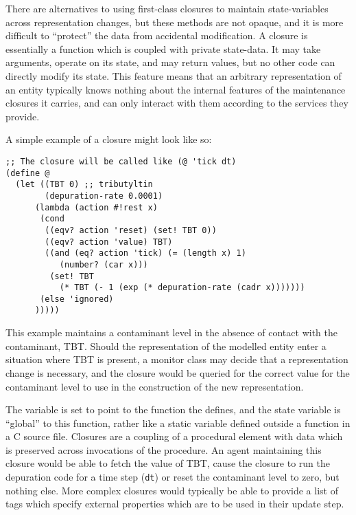 There are alternatives to using first-class closures to maintain
state-variables across representation changes, but these methods are
not opaque, and it is more difficult to ``protect'' the data from
accidental modification.  A closure is essentially a function which is
coupled with private state-data. It may take arguments, operate on its
state, and may return values, but no other code can directly modify
its state.  This feature means that an arbitrary representation of an
entity typically knows nothing about the internal features of the
maintenance closures it carries, and can only interact with them
according to the services they provide.

A simple example of a closure might look like so:
\begin{verbatim}
;; The closure will be called like (@ 'tick dt) 
(define @
  (let ((TBT 0) ;; tributyltin
        (depuration-rate 0.0001) 
      (lambda (action #!rest x)
       (cond
        ((eqv? action 'reset) (set! TBT 0))
        ((eqv? action 'value) TBT)
        ((and (eq? action 'tick) (= (length x) 1) 
           (number? (car x)))
         (set! TBT 
           (* TBT (- 1 (exp (* depuration-rate (cadr x)))))))
       (else 'ignored)
      )))))

\end{verbatim}
This example maintains a contaminant level in the absence of contact
with the contaminant, TBT.  Should the representation of the
modelled entity enter a situation where TBT is present, a monitor
class may decide that a representation change is necessary, and the
closure would be queried for the correct value for the contaminant
level to use in the construction of the new representation.

The variable  is set to point to the function the
 defines, and the state variable  is
``global'' to this function, rather like a static variable defined
outside a function in a C source file. Closures are a coupling of a
procedural element with data which is preserved across invocations of
the procedure. An agent maintaining this closure would be able to
fetch the value of TBT, cause the closure to run the depuration code
for a time step (\texttt{dt}) or reset the contaminant level to zero,
but nothing else.  More complex closures would typically be able to
provide a list of tags which specify external properties which are to
be used in their update step.

